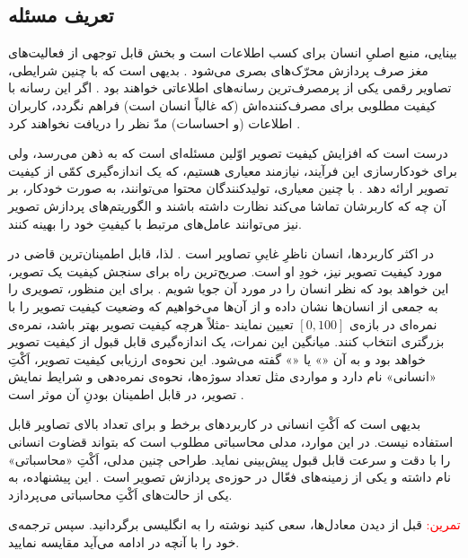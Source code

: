 \documentclass{article}
\begin{document}
\begin{framed}
\subsection*{تعریف مسئله}
بینایی، منبع اصلیِ انسان برای کسب اطلاعات است \cite{cole2021motivated} و بخش قابل توجهی از فعالیت‌های مغز صرف پردازش محرّک‌های بصری می‌شود \cite{sheth2016two}. بدیهی است که با چنین شرایطی، تصاویر رقمی یکی از پرمصرف‌ترین رسانه‌های اطلاعاتی خواهند بود \cite{cisco}. اگر این رسانه با کیفیت مطلوبی برای مصرف‌کننده‌اش (که غالباً انسان است) فراهم نگردد، کاربران اطلاعات (و احساسات) مدّ نظر را دریافت نخواهند کرد \cite{mittal2013natural}. 

درست است که افزایش کیفیت تصویر \cite{gonzalez2009digital} اوّلین مسئله‌ای است که به ذهن می‌رسد، ولی برای خودکارسازی این فرآیند، نیازمند معیاری هستیم، که یک اندازه‌گیری کمّی از کیفیت تصویر ارائه دهد \cite{wang2004image}. با چنین معیاری، تولیدکنندگان محتوا می‌توانند، به صورت خودکار، بر آن چه که کاربرشان تماشا می‌کند نظارت داشته باشند و الگوریتم‌های پردازش تصویر نیز می‌توانند عامل‌های مرتبط با کیفیتِ خود را بهینه کنند.

در اکثر کاربردها، انسان ناظرِ غاییِ تصاویر است \cite{bosse2016deep}. لذا، قابل اطمینان‌ترین قاضی در مورد کیفیت تصویر نیز، خودِ او است. صریح‌ترین راه برای سنجش کیفیت یک تصویر، این خواهد بود که نظر انسان را در مورد آن جویا شویم \cite{ghadiyaram2015massive}. برای این منظور، تصویری را به جمعی از انسان‌ها نشان داده و از آن‌ها می‌خواهیم که وضعیت کیفیت تصویر را با نمره‌ای در بازه‌ی $[0, 100]$ تعیین نمایند -مثلاً هرچه کیفیت تصویر بهتر باشد، نمره‌ی بزرگتری انتخاب کنند. میانگین این نمرات، یک اندازه‌گیری قابل قبول از کیفیت تصویر خواهد بود و به آن «» یا «» گفته می‌شود. این نحوه‌ی ارزیابی کیفیت تصویر، اَکْتِ «انسانی» نام دارد \cite{cheraaqee} و مواردی مثل تعداد سوژه‌ها، نحوه‌ی نمره‌دهی و شرایط نمایش تصویر، در قابل اطمینان بودنِ آن موثر است \cite{video2003final}.

بدیهی است که اَکْتِ انسانی در کاربردهای برخط و برای تعداد بالای تصاویر قابل استفاده نیست. در این موارد، مدلی محاسباتی مطلوب است که بتواند قضاوت انسانی را با دقت و سرعت قابل قبول پیش‌بینی نماید. طراحی چنین مدلی، اَکْتِ «محاسباتی» نام داشته و یکی از زمینه‌های فعّال در حوزه‌ی پردازش تصویر است \cite{zhai2020perceptual}. این پیشنهاده، به یکی از حالت‌های اَکْتِ محاسباتی می‌پردازد.
\end{framed}
\begin{framed}


\end{framed}
\noindent \textcolor{red}{تمرین:} قبل از دیدن معادل‌ها، سعی کنید نوشته را به انگلیسی برگردانید. سپس ترجمه‌ی خود را با آنچه در ادامه می‌آید مقایسه نمایید.
\end{document}
